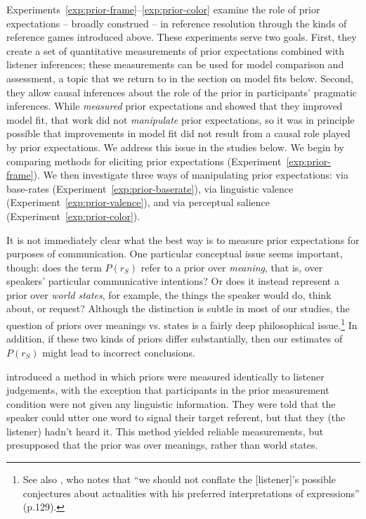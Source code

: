 \documentclass[man]{apa6}
\newcounter{Experiment}
\newcommand{\exptref}[1]{Experiment~\ref{#1}}
\newcommand{\exptrefrange}[2]{Experiments~\ref{#1}--\ref{#2}}
\begin{document}
\exptrefrange{exp:prior-frame}{exp:prior-color} examine the role of prior expectations -- broadly construed -- in reference resolution through the kinds of reference games introduced above. These experiments serve two goals. First, they create a set of quantitative measurements of prior expectations combined with listener inferences; these measurements can be used for model comparison and assessment, a topic that we return to in the section on model fits below. Second, they allow causal inferences about the role of the prior in participants' pragmatic inferences. While  \emph{measured} prior expectations and showed that they improved model fit, that work did not \emph{manipulate} prior expectations, so it was in principle possible that improvements in model fit did not result from a causal role played by prior expectations. We address this issue in the studies below. We begin by comparing methods for eliciting prior expectations (\exptref{exp:prior-frame}). We then investigate three ways of manipulating prior expectations: via base-rates (\exptref{exp:prior-baserate}), via linguistic valence (\exptref{exp:prior-valence}), and via perceptual salience (\exptref{exp:prior-color}).

It is not immediately clear what the best way is to measure prior expectations for purposes of communication. One particular conceptual issue seems important, though: does the term $P(r_S)$ refer to a prior over \emph{meaning}, that is, over speakers' particular communicative intentions? Or does it instead represent a prior over \emph{world states}, for example, the things the speaker would do, think about, or request? Although the distinction is subtle in most of our studies, the question of priors over meanings vs. states is a fairly deep philosophical issue.\footnote{See also , who notes that ``we should not conflate the [listener]'s possible conjectures about actualities with his preferred interpretations of expressions'' (p.129).}  In addition, if these two kinds of priors differ substantially, then our estimates of $P(r_S)$ might lead to incorrect conclusions.

 introduced a method in which priors were measured identically to listener judgements, with the exception that participants in the prior measurement condition were not given any linguistic information. They were told that the speaker could utter one word to signal their target referent, but that they (the listener) hadn't heard it. This method yielded reliable measurements, but presupposed that the prior was over meanings, rather than world states.
\end{document}
